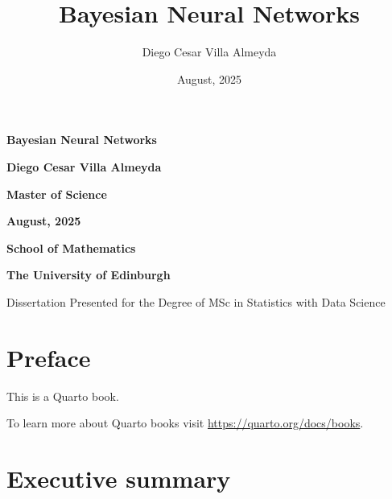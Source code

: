 \documentclass[
  a4paper,
]{scrreprt}
\title{Bayesian Neural Networks}
\author{Diego Cesar Villa Almeyda}
\date{August, 2025}
\renewcommand*\contentsname{Table of contents}
\newcommand\contentsname{Table of contents}
\begin{document}
\cleardoublepage
\thispagestyle{empty}
\vspace*{2cm}  %

\begin{center}
  {\huge\bfseries Bayesian Neural Networks \par}
    
  \vspace{6em}

    {\Large\bfseries Diego Cesar Villa Almeyda \par}
  
  \vspace{2em}
  {\bfseries\large Master of Science \par}
  
  \vspace{1.5em}
  {\bfseries\large August, 2025 \par}
  
  \vspace{4em}

      {\bfseries\large School of Mathematics \par}
    
  {\bfseries\large The University of Edinburgh \par}
      
  \vspace{6em}
  {\small Dissertation Presented for the Degree of MSc in Statistics with Data Science \par}
\end{center}

\renewcommand*\contentsname{Table of contents}
{
\hypersetup{linkcolor=}
\setcounter{tocdepth}{2}
\tableofcontents
}


\chapter*{Preface}\label{preface}


This is a Quarto book.

To learn more about Quarto books visit
\url{https://quarto.org/docs/books}.


\chapter*{Executive summary}\label{executive-summary}
\end{document}
